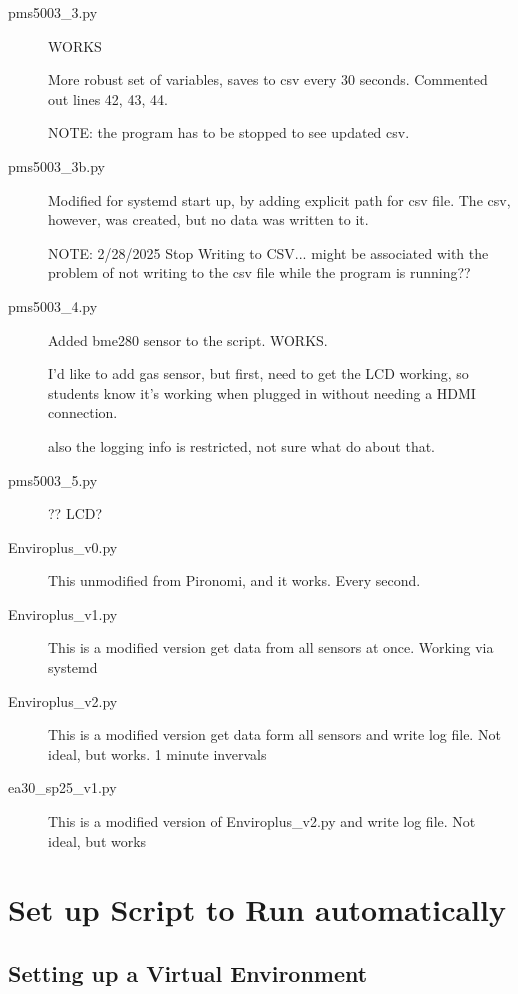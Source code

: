 \documentclass{article}
\begin{document}
\begin{description}

\item[pms5003\_3.py] WORKS

More robust set of variables, saves to csv every 30 seconds. Commented out lines 42, 43, 44.

NOTE: the program has to be stopped to see updated csv. 

\item[pms5003\_3b.py] Modified for systemd start up, by adding explicit path for csv file. The csv, however, was created, but no data was written to it.


NOTE: 2/28/2025 Stop Writing to CSV... might be associated with the problem of not writing to the csv file while the program is running??


\item[pms5003\_4.py] Added bme280 sensor to the script. WORKS.

I'd like to add gas sensor, but first, need to get the LCD working, so students know
it's working when plugged in without needing a HDMI connection. 

also the logging info is restricted, not sure what do about that.


\item[pms5003\_5.py] ?? LCD?

\item[Enviroplus\_v0.py] This unmodified from Pironomi, and it works. Every second.
  
  
\item[Enviroplus\_v1.py] This is a modified version get data from all sensors at once. Working via systemd

\item[Enviroplus\_v2.py] This is a modified version get data form all sensors and write log file. Not ideal, but works. 1 minute invervals

\item[ea30_sp25\_v1.py] This is a modified version of Enviroplus\_v2.py and write log file. Not ideal, but works  

\end{description}


\section{Set up Script to Run automatically}

\subsection{Setting up a Virtual Environment}
\end{document}
